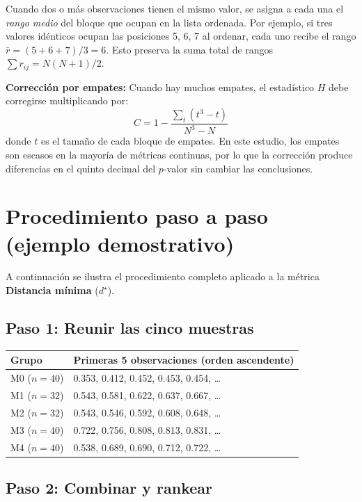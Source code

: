 \documentclass[12pt,a4paper,oneside]{book}
\begin{document}
Cuando dos o más observaciones tienen el mismo valor, se asigna a cada una el \emph{rango medio} del bloque que ocupan en la lista ordenada. Por ejemplo, si tres valores idénticos ocupan las posiciones 5, 6, 7 al ordenar, cada uno recibe el rango $\bar{r}=(5+6+7)/3=6$. Esto preserva la suma total de rangos $\sum r_{ij} = N(N+1)/2$.

\textbf{Corrección por empates:} Cuando hay muchos empates, el estadístico $H$ debe corregirse multiplicando por:
\begin{equation}
C = 1 - \frac{\sum_t (t^3 - t)}{N^3 - N}
\end{equation}
donde $t$ es el tamaño de cada bloque de empates. En este estudio, los empates son escasos en la mayoría de métricas continuas, por lo que la corrección produce diferencias en el quinto decimal del $p$-valor sin cambiar las conclusiones.

\newpage
\section{Procedimiento paso a paso (ejemplo demostrativo)}

A continuación se ilustra el procedimiento completo aplicado a la métrica \textbf{Distancia mínima} ($d^\star$).

\subsection{Paso 1: Reunir las cinco muestras}

\begin{tabular}{lp{12cm}}
\toprule
\textbf{Grupo} & \textbf{Primeras 5 observaciones (orden ascendente)} \\
\midrule
M0 ($n=40$) & 0.353, 0.412, 0.452, 0.453, 0.454, \ldots \\
M1 ($n=32$) & 0.543, 0.581, 0.622, 0.637, 0.667, \ldots \\
M2 ($n=32$) & 0.543, 0.546, 0.592, 0.608, 0.648, \ldots \\
M3 ($n=40$) & 0.722, 0.756, 0.808, 0.813, 0.831, \ldots \\
M4 ($n=40$) & 0.538, 0.689, 0.690, 0.712, 0.722, \ldots \\
\bottomrule
\end{tabular}

\subsection{Paso 2: Combinar y rankear}
\end{document}

